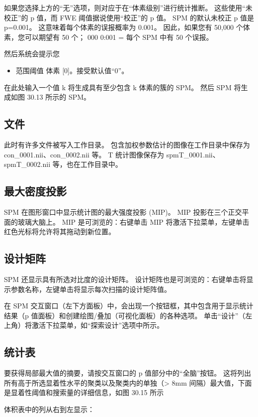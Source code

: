 如果您选择上方的“无”选项，则对应于在“体素级别”进行统计推断。 这些使用“未校正”的 p 值，而 FWE 阈值据说使用“校正”的 p 值。 SPM 的默认未校正 p 值是 p=0.001。 这意味着每个体素的误报概率为 0.001。 因此，如果您有 50,000 个体素，您可以期望有 50 个； 000 0:001 = 每个 SPM 中有 50 个误报。

然后系统会提示您
\begin{itemize}
	\item 范围阈值 {体素} [0]。接受默认值“0”。
\end{itemize}

在此处输入一个值 k 将生成具有至少包含 k 体素的簇的 SPM。 然后 SPM 将生成如图 30.13 所示的 SPM。

\subsection{文件}

此时有许多文件被写入工作目录。 包含加权参数估计的图像在工作目录中保存为 con\_0001.nii、con\_0002.nii 等。 T 统计图像保存为 spmT\_0001.nii、spmT\_0002.nii 等，也在工作目录中。

\subsection{最大密度投影}

SPM 在图形窗口中显示统计图的最大强度投影 (MIP)。 MIP 投影在三个正交平面的玻璃大脑上。 MIP 是可浏览的：右键单击 MIP 将激活下拉菜单，左键单击红色光标将允许将其拖动到新位置。

\subsection{设计矩阵}
SPM 还显示具有所选对比度的设计矩阵。 设计矩阵也是可浏览的：右键单击将显示参数名称，左键单击将显示每次扫描的设计矩阵值。

在 SPM 交互窗口（左下方面板）中，会出现一个按钮框，其中包含用于显示统计结果（p 值面板）和创建绘图/叠加（可视化面板）的各种选项。 单击“设计”（左上角）将激活下拉菜单，如“探索设计”选项中所示。

\subsection{统计表}
要获得局部最大值的摘要，请按交互窗口的 p 值部分中的“全脑”按钮。 这将列出所有高于所选显着性水平的聚类以及聚类内的单独（> 8mm 间隔）最大值，下面是显着性阈值和搜索量的详细信息，如图 30.15 所示

体积表中的列从右到左显示：

